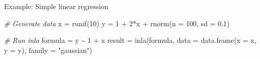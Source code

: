 \documentclass[
  ignorenonframetext,
]{beamer}
\newenvironment{Shaded}{\begin{snugshade}}{\end{snugshade}}
\newcommand{\AttributeTok}[1]{\textcolor[rgb]{0.77,0.63,0.00}{#1}}
\newcommand{\CommentTok}[1]{\textcolor[rgb]{0.56,0.35,0.01}{\textit{#1}}}
\newcommand{\DecValTok}[1]{\textcolor[rgb]{0.00,0.00,0.81}{#1}}
\newcommand{\FloatTok}[1]{\textcolor[rgb]{0.00,0.00,0.81}{#1}}
\newcommand{\FunctionTok}[1]{\textcolor[rgb]{0.00,0.00,0.00}{#1}}
\newcommand{\NormalTok}[1]{#1}
\newcommand{\OtherTok}[1]{\textcolor[rgb]{0.56,0.35,0.01}{#1}}
\newcommand{\SpecialCharTok}[1]{\textcolor[rgb]{0.00,0.00,0.00}{#1}}
\newcommand{\StringTok}[1]{\textcolor[rgb]{0.31,0.60,0.02}{#1}}
\begin{document}
\begin{frame}[fragile]{Example: Simple linear regression}
\protect\hypertarget{example-simple-linear-regression-1}{}
\begin{Shaded}
\begin{Highlighting}[]
\CommentTok{\# Generate data}
\NormalTok{x }\OtherTok{=} \FunctionTok{runif}\NormalTok{(}\DecValTok{10}\NormalTok{)}
\NormalTok{y }\OtherTok{=} \DecValTok{1} \SpecialCharTok{+} \DecValTok{2}\SpecialCharTok{*}\NormalTok{x }\SpecialCharTok{+} \FunctionTok{rnorm}\NormalTok{(}\AttributeTok{n =} \DecValTok{100}\NormalTok{, }\AttributeTok{sd =} \FloatTok{0.1}\NormalTok{)}

\CommentTok{\# Run inla}
\NormalTok{formula }\OtherTok{=}\NormalTok{ y }\SpecialCharTok{\textasciitilde{}} \DecValTok{1} \SpecialCharTok{+}\NormalTok{ x}
\NormalTok{result }\OtherTok{=} \FunctionTok{inla}\NormalTok{(formula,}
              \AttributeTok{data =} \FunctionTok{data.frame}\NormalTok{(}\AttributeTok{x =}\NormalTok{ x, }\AttributeTok{y =}\NormalTok{ y),}
              \AttributeTok{family =} \StringTok{"gaussian"}\NormalTok{)}
\end{Highlighting}
\end{Shaded}
\end{frame}
\end{document}
